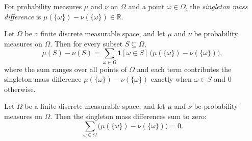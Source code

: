 \begin{definition}
\label{CommunicationComplexity.TVDistance.singletonMassDiff}
\leanok
For probability measures $\mu$ and $\nu$ on $\Omega$ and a point $\omega \in \Omega$,
the \emph{singleton mass difference} is $\mu(\{\omega\}) - \nu(\{\omega\}) \in \mathbb{R}$.
\end{definition}

\begin{lemma}
\label{CommunicationComplexity.TVDistance.measureReal_sub_eq_sum_indicator_singletonMassDiff}
\leanok
{}
Let $\Omega$ be a finite discrete measurable space, and let $\mu$ and $\nu$ be
probability measures on $\Omega$. Then for every subset $S \subseteq \Omega$,
\[
\mu(S) - \nu(S) = \sum_{\omega \in \Omega} \mathbf{1}[\omega \in
S]\,\bigl(\mu(\{\omega\}) - \nu(\{\omega\})\bigr),
\]
where the sum ranges over all points of $\Omega$ and each term contributes the singleton
mass difference $\mu(\{\omega\}) - \nu(\{\omega\})$ exactly when $\omega \in S$ and $0$
otherwise.
\end{lemma}

\begin{lemma}
\label{CommunicationComplexity.TVDistance.sum_singletonMassDiff_eq_zero}
\leanok
{}
Let $\Omega$ be a finite discrete measurable space, and let $\mu$ and $\nu$ be
probability measures on $\Omega$. Then the singleton mass differences sum to zero:
\[
\sum_{\omega \in \Omega} \bigl(\mu(\{\omega\}) - \nu(\{\omega\})\bigr) = 0.
\]
\end{lemma}


